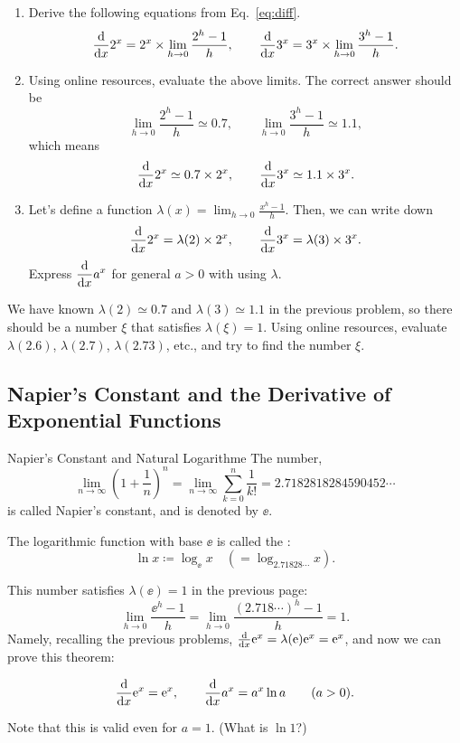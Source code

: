 \documentclass[11pt,pdfa,lastpage]{MishoNote}
\newcommand\starskip{\bigskip\begin{center}\pgfornament[width=7cm]{88}\end{center}\medskip}
\begin{document}
\starskip

\begin{enumerate}[resume]
 \itemB
 \begin{enumerate}
  \item Derive the following equations from Eq.~\eqref{eq:diff}.
\[
  \diff{}{x}2^x = 2^x\times\lim_{h\to 0}\frac{2^h-1}{h},\qquad
  \diff{}{x}3^x = 3^x\times\lim_{h\to 0}\frac{3^h-1}{h}.
\]
\item Using online resources, evaluate the above limits. The correct answer should be
\[
  \lim_{h\to 0}\frac{2^h-1}{h}\simeq0.7, \qquad \lim_{h\to 0}\frac{3^h-1}{h}\simeq1.1,
\]
which means
\[
  \diff{}{x}2^x \simeq 0.7\times2^x,\qquad
  \diff{}{x}3^x \simeq 1.1\times3^x.
\]
\item Let's define a function $\displaystyle\lambda(x)=\lim_{h\to 0}\frac{x^h-1}{h}$. Then, we can write down
\[
  \diff{}{x}2^x = \lambda(2)\times2^x,\qquad
  \diff{}{x}3^x = \lambda(3)\times3^x.
\]
Express $\displaystyle\diff{}{x}a^x$ for general $a>0$ with using $\lambda$.
\end{enumerate}
\itemC We have known $\lambda(2)\simeq 0.7$ and $\lambda(3)\simeq 1.1$ in the previous problem, so there should be a number $\xi$ that satisfies $\lambda(\xi)=1$.
Using online resources, evaluate $\lambda(2.6)$, $\lambda(2.7)$, $\lambda(2.73)$, etc., and try to find the number $\xi$.
\end{enumerate}

\newpage
\subsection{Napier's Constant and the Derivative of Exponential Functions}
\begin{definition}{Napier's Constant and Natural Logarithm}{e}
The number,
\begin{equation}
  \lim_{n\to\infty}\left(1+\frac{1}n\right)^n=\lim_{n\to\infty}\sum_{k=0}^n\frac{1}{k!}=2.7182818284590452\cdots\label{eq:napier}
\end{equation}
is called Napier's constant, and is denoted by $\ee$.

The logarithmic function with base $\ee$ is called the :
\[
  \ln x \coloneq \log_{\ee} x \quad(=\log_{2.71828\cdots}x).
\]
\end{definition}
This number satisfies $\lambda(\ee)=1$ in the previous page:
\[
  \lim_{h\to 0}\frac{\ee^h-1}{h}= \lim_{h\to 0}\frac{(2.718\cdots)^h-1}{h}=1.
\]
Namely, recalling the previous problems,
$ \diff{}{x}\ee^x=\lambda(\ee)\ee^x=\ee^x$, and now
we can prove this theorem:
\begin{theorem}{}{}
  \begin{equation}
      \diff{}x{\ee^x}=\ee^x,\qquad
      \diff{}x{a^x}=a^x\ln a\qquad(a>0).
  \end{equation}
\end{theorem}
Note that this is valid even for $a=1$. (What is $\ln 1$?)
\end{document}
